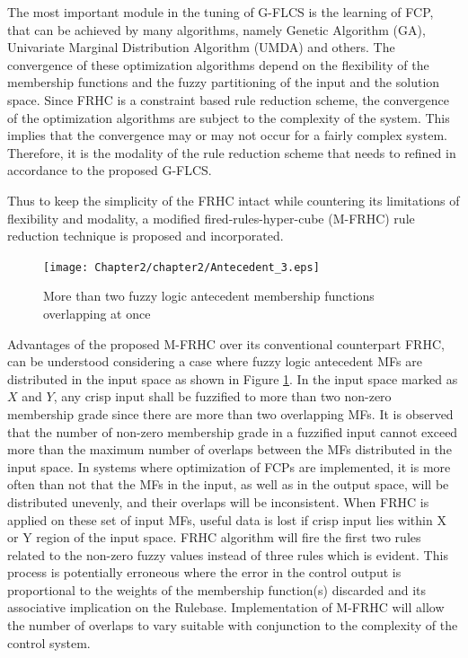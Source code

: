 The most important module in the tuning of G-FLCS is the learning of FCP, that can be achieved by many algorithms, namely Genetic Algorithm (GA), Univariate Marginal Distribution Algorithm (UMDA) and others. The convergence of these optimization algorithms depend on the flexibility of the membership functions and the fuzzy partitioning of the input and the solution space. Since FRHC is a constraint based rule reduction scheme, the convergence of the optimization algorithms are subject to the complexity of the system. This implies that the convergence may or may not occur for a fairly complex system. Therefore, it is the modality of the rule reduction scheme that needs to refined in accordance to the proposed G-FLCS. 

Thus to keep the simplicity of the FRHC intact while countering its limitations of flexibility and modality, a modified fired-rules-hyper-cube (M-FRHC) rule reduction technique is proposed and incorporated.
\begin{figure}[ht]
	\centering
	\texttt{[image: Chapter2/chapter2/Antecedent\_3.eps]}
	\caption{More than two fuzzy logic antecedent membership functions overlapping at once}
	\label{fig:FuzzyLogicAntecedentMembershipFunctions}
\end{figure}

Advantages of the proposed M-FRHC over its conventional counterpart FRHC, can be understood considering a case where fuzzy logic antecedent MFs are distributed in the input space as shown in Figure \ref{fig:FuzzyLogicAntecedentMembershipFunctions}. In the input space marked as $ X $ and $ Y $, any crisp input shall be fuzzified to more than two non-zero membership grade since there are more than two overlapping MFs. It is observed that the number of non-zero membership grade in a fuzzified input cannot exceed more than the maximum number of overlaps between the MFs distributed in the input space. In systems where optimization of FCPs are implemented, it is more often than not that the MFs in the input, as well as in the output space, will be distributed unevenly, and their overlaps will be inconsistent. When FRHC is applied on these set of input MFs, useful data is lost if crisp input lies within X or Y region of the input space. FRHC algorithm will fire the first two rules related to the non-zero fuzzy values instead of three rules which is evident. This process is potentially erroneous where the error in the control output is proportional to the weights of the membership function(s) discarded and its associative implication on the Rulebase. Implementation of M-FRHC will allow the number of overlaps to vary suitable with conjunction to the complexity of the control system. 

